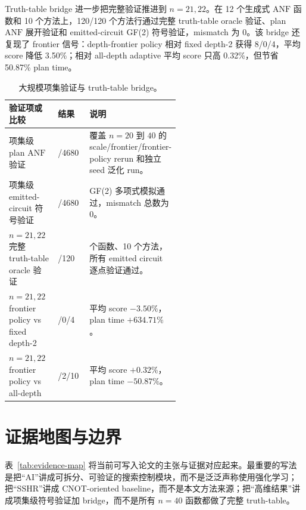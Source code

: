 \documentclass[UTF8,fontset=macnew,11pt]{ctexart}
\newcommand{\anf}{\ensuremath{\mathrm{ANF}}}
\newcommand{\ttable}{truth-table}
\begin{document}
Truth-table bridge 进一步把完整验证推进到 $n=21,22$。在 12 个生成式 \anf{} 函数和 10 个方法上，120/120 个方法行通过完整 \ttable{} oracle 验证、plan \anf{} 展开验证和 emitted-circuit GF(2) 符号验证，mismatch 为 0。该 bridge 还复现了 frontier 信号：depth-frontier policy 相对 fixed depth-2 获得 8/0/4，平均 score 降低 3.50\%；相对 all-depth adaptive 平均 score 只高 0.32\%，但节省 50.87\% plan time。

\begin{table}[H]
\centering
\scriptsize
\caption{大规模项集验证与 truth-table bridge。}
\label{tab:verification}
\begin{tabularx}{\linewidth}{>{\raggedright\arraybackslash}p{0.35\linewidth}>{\raggedright\arraybackslash}p{0.22\linewidth}>{\raggedright\arraybackslash}X}
\toprule
验证项或比较 & 结果 & 说明 \\
\midrule
项集级 plan \anf{} 验证 & 4680/4680 & 覆盖 $n=20$ 到 $40$ 的 scale/frontier/frontier-policy rerun 和独立 seed 泛化 run。 \\
项集级 emitted-circuit 符号验证 & 4680/4680 & GF(2) 多项式模拟通过，mismatch 总数为 0。 \\
$n=21,22$ 完整 \ttable{} oracle 验证 & 120/120 & 12 个函数、10 个方法，所有 emitted circuit 逐点验证通过。 \\
$n=21,22$ frontier policy vs fixed depth-2 & 8/0/4 & 平均 score $-3.50\%$，plan time $+634.71\%$。 \\
$n=21,22$ frontier policy vs all-depth & 0/2/10 & 平均 score $+0.32\%$，plan time $-50.87\%$。 \\
\bottomrule
\end{tabularx}
\end{table}

\section{证据地图与边界}

表~\ref{tab:evidence-map} 将当前可写入论文的主张与证据对应起来。最重要的写法是把“AI”讲成可拆分、可验证的搜索控制模块，而不是泛泛声称使用强化学习；把“SSHR”讲成 CNOT-oriented baseline，而不是本文方法来源；把“高维结果”讲成项集级符号验证加 bridge，而不是所有 $n=40$ 函数都做了完整 \ttable{}。
\end{document}
